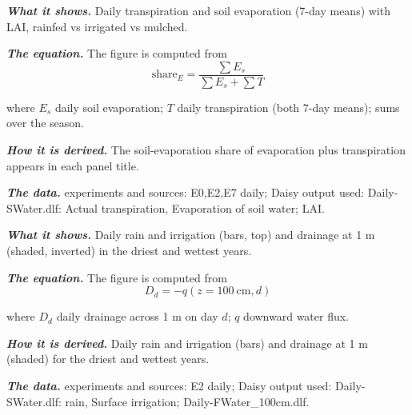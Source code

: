 \label{fig:a19_15}
\par\noindent\textbf{\color{khmag}\emph{What it shows.}} Daily transpiration and soil evaporation (7-day means) with LAI, rainfed vs irrigated vs mulched.
\par\noindent\textbf{\color{khmag}\emph{The equation.}} The figure is computed from
\begin{equation}\boxed{\text{share}_{E}=\dfrac{\sum E_s}{\sum E_s+\sum T}}\end{equation}
\par\noindent where $E_s$ daily soil evaporation; $T$ daily transpiration (both 7-day means); sums over the season.
\par\noindent\textbf{\color{khmag}\emph{How it is derived.}} The soil-evaporation share of evaporation plus transpiration appears in each panel title.
\par\noindent\textbf{\color{khmag}\emph{The data.}} experiments and sources: E0,E2,E7 daily; Daisy output used: Daily-SWater.dlf: Actual transpiration, Evaporation of soil water; LAI.
\par\vspace{6pt}\noindent{}\par\nobreak
{}\label{fig:a19_16}
\par\noindent\textbf{\color{khmag}\emph{What it shows.}} Daily rain and irrigation (bars, top) and drainage at 1 m (shaded, inverted) in the driest and wettest years.
\par\noindent\textbf{\color{khmag}\emph{The equation.}} The figure is computed from
\begin{equation}\boxed{D_d=-q(z{=}100\ \mathrm{cm},d)}\end{equation}
\par\noindent where $D_d$ daily drainage across 1 m on day $d$; $q$ downward water flux.
\par\noindent\textbf{\color{khmag}\emph{How it is derived.}} Daily rain and irrigation (bars) and drainage at 1 m (shaded) for the driest and wettest years.
\par\noindent\textbf{\color{khmag}\emph{The data.}} experiments and sources: E2 daily; Daisy output used: Daily-SWater.dlf: rain, Surface irrigation; Daily-FWater\_100cm.dlf.
\par\vspace{6pt}\noindent{}\par\nobreak
